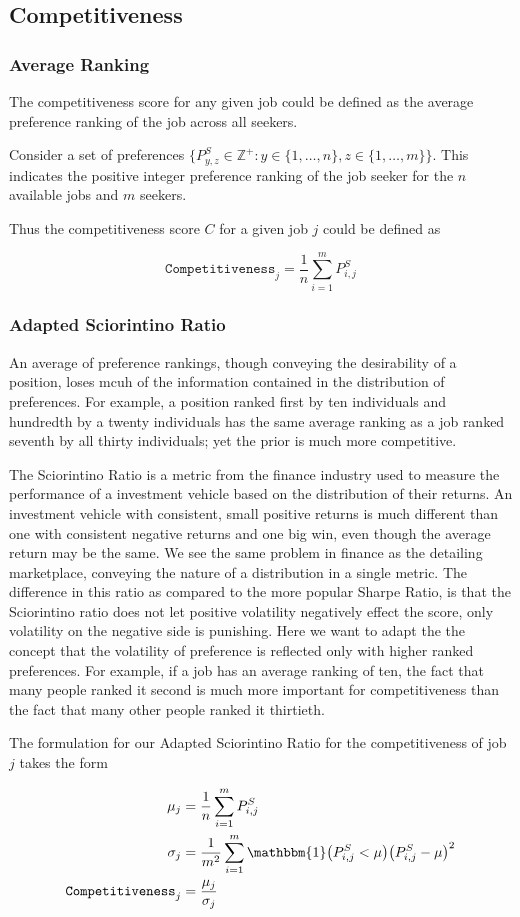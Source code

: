 \subsection{Competitiveness}

\subsubsection{Average Ranking}

The competitiveness score for any given job could be defined as the average preference ranking of the job across all seekers.

Consider a set of preferences $\{P^{S}_{y,z} \in \mathbb{Z}^+: y \in \{1, \dots, n\}, z \in \{1, \dots, m\}\}$. This indicates the positive integer preference ranking of the job seeker for the $n$ available jobs and $m$ seekers. 

Thus the competitiveness score $C$ for a given job $j$ could be defined as 

\[\texttt{Competitiveness}_j = \frac{1}{n} \sum_{i=1}^m P^S_{i,j}\]

\subsubsection{Adapted Sciorintino Ratio}

An average of preference rankings, though conveying the desirability of a position, loses mcuh of the information contained in the distribution of preferences. For example, a position ranked first by ten individuals and hundredth by a twenty individuals has the same average ranking as a job ranked seventh by all thirty individuals; yet the prior is much more competitive. 

The Sciorintino Ratio is a metric from the finance industry used to measure the performance of a investment vehicle based on the distribution of their returns. An investment vehicle with consistent, small positive returns is much different than one with consistent negative returns and one big win, even though the average return may be the same. We see the same problem in finance as the detailing marketplace, conveying the nature of a distribution in a single metric. The difference in this ratio as compared to the more popular Sharpe Ratio, is that the Sciorintino ratio does not let positive volatility negatively effect the score, only volatility on the negative side is punishing. Here we want to adapt the the concept that the volatility of preference is reflected only with higher ranked preferences. For example, if a job has an average ranking of ten, the fact that many people ranked it second is much more important for competitiveness than the fact that many other people ranked it thirtieth.

The formulation for our Adapted Sciorintino Ratio for the competitiveness of job $j$ takes the form

\begin{align}
\mu_j &= \frac{1}{n} \sum_{i=1}^m P^S_{i,j} \\
\sigma_j &= \frac{1}{m^2} \sum_{i=1}^m \mathbbm{1}\big( P^S_{i,j} < \mu \big) \big(P^S_{i,j} - \mu \big)^2 \\
\texttt{Competitiveness}_j &= \frac{\mu_j}{\sigma_j}
\end{align}